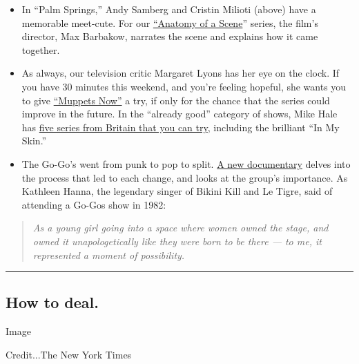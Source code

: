 \begin{itemize}
\item
  In ``Palm Springs,'' Andy Samberg and Cristin Milioti (above) have a
  memorable meet-cute. For our
  \href{https://www.nytimes.com/2020/07/31/movies/palm-springs-clip-hulu.html}{``Anatomy
  of a Scene}'' series, the film's director, Max Barbakow, narrates the
  scene and explains how it came together.
\item
  As always, our television critic Margaret Lyons has her eye on the
  clock. If you have 30 minutes this weekend, and you're feeling
  hopeful, she wants you to give
  \href{https://www.nytimes.com/2020/07/30/arts/television/muppets-disney-errol-morris-first-person.html}{``Muppets
  Now''} a try, if only for the chance that the series could improve in
  the future. In the ``already good'' category of shows, Mike Hale has
  \href{https://www.nytimes.com/2020/07/30/arts/television/in-my-skin-hulu.html}{five
  series from Britain that you can try}, including the brilliant ``In My
  Skin.''
\item
  The Go-Go's went from punk to pop to split.
  \href{https://www.nytimes.com/2020/07/29/arts/music/the-go-gos-documentary.html}{A
  new documentary} delves into the process that led to each change, and
  looks at the group's importance. As Kathleen Hanna, the legendary
  singer of Bikini Kill and Le Tigre, said of attending a Go-Gos show in
  1982:
\end{itemize}

\begin{quote}
\emph{As a young girl going into a space where women owned the stage,
and owned it unapologetically like they were born to be there --- to me,
it represented a moment of possibility.}
\end{quote}

\begin{center}\rule{0.5\linewidth}{\linethickness}\end{center}

\hypertarget{how-to-deal}{%
\subsection{How to deal.}\label{how-to-deal}}

Image

Credit...The New York Times

